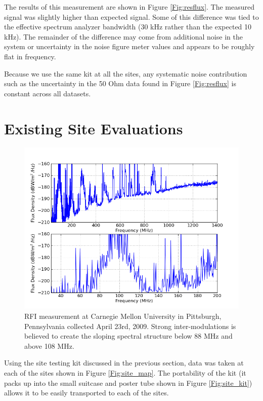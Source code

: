 The results of this measurement are shown in Figure \ref{Fig:resflux}. The measured signal was slightly higher than expected signal. Some of this difference was tied to the effective spectrum analyzer bandwidth (30 kHz rather than the expected 10 kHz). The remainder of the difference may come from additional noise in the system or uncertainty in the noise figure meter values and appears to be roughly flat in frequency. 

Because we use the same kit at all the sites, any systematic noise contribution such as the uncertainty in the 50 Ohm data found in Figure \ref{Fig:resflux} is constant across all datasets. 

\section{Existing Site Evaluations}

\begin{figure}[tb]
\begin{center}
\includegraphics[width=0.9\linewidth]{RFI_testing/figures/Pittsburgh_cal.png}
\caption{RFI measurement at Carnegie Mellon University in Pittsburgh, Pennsylvania collected April 23rd, 2009. Strong inter-modulations is believed to create the sloping spectral structure below 88 MHz and above 108 MHz.}
\label{Fig:pghcal}
\end{center}
\end{figure}


Using the site testing kit discussed in the previous section, data was taken at each of the sites shown in Figure \ref{Fig:site_map}. The portability of the kit (it packs up into the small suitcase and poster tube shown in Figure \ref{Fig:site_kit}) allows it to be easily transported to each of the sites. 

